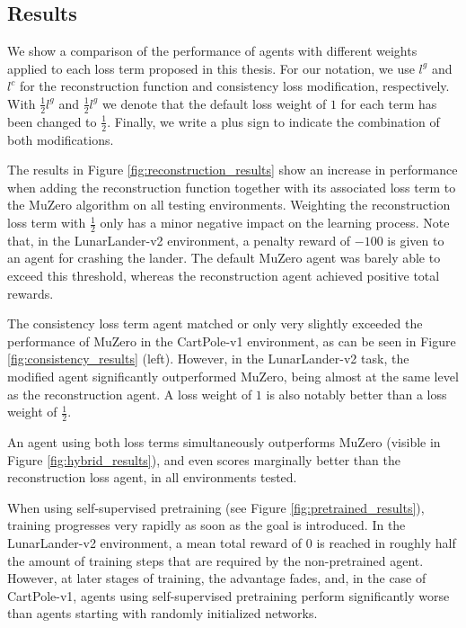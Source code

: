 \subsection{Results}
We show a comparison of the performance of agents with different weights applied to each loss term proposed in this thesis. For our notation, we use $l^g$ and $l^c$ for the reconstruction function and consistency loss modification, respectively. With $\frac{1}{2}l^g$ and $\frac{1}{2}l^g$ we denote that the default loss weight of $1$ for each term has been changed to $\frac{1}{2}$. Finally, we write a plus sign to indicate the combination of both modifications.

The results in Figure \ref{fig:reconstruction_results} show an increase in performance when adding the reconstruction function together with its associated loss term to the MuZero algorithm on all testing environments. Weighting the reconstruction loss term with $\frac{1}{2}$ only has a minor negative impact on the learning process. Note that, in the LunarLander-v2 environment, a penalty reward of $-100$ is given to an agent for crashing the lander. The default MuZero agent was barely able to exceed this threshold, whereas the reconstruction agent achieved positive total rewards.

The consistency loss term agent matched or only very slightly exceeded the performance of MuZero in the CartPole-v1 environment, as can be seen in Figure \ref{fig:consistency_results} (left). However, in the LunarLander-v2 task, the modified agent significantly outperformed MuZero, being almost at the same level as the reconstruction agent. A loss weight of $1$ is also notably better than a loss weight of $\frac{1}{2}$.

An agent using both loss terms simultaneously outperforms MuZero (visible in Figure \ref{fig:hybrid_results}), and even scores marginally better than the reconstruction loss agent, in all environments tested.

When using self-supervised pretraining (see Figure \ref{fig:pretrained_results}), training progresses very rapidly as soon as the goal is introduced. In the LunarLander-v2 environment, a mean total reward of $0$ is reached in roughly half the amount of training steps that are required by the non-pretrained agent. However, at later stages of training, the advantage fades, and, in the case of CartPole-v1, agents using self-supervised pretraining perform significantly worse than agents starting with randomly initialized networks.

